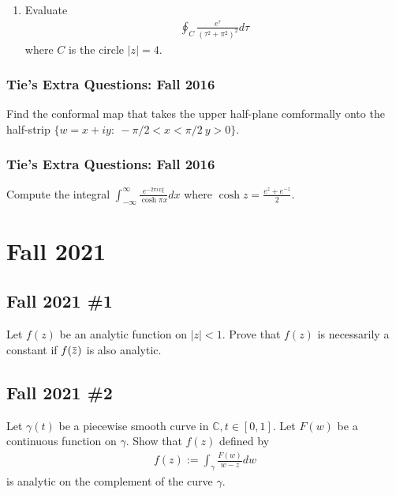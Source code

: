 \begin{enumerate}
\def\labelenumi{(\alph{enumi})}
\setcounter{enumi}{1}
\tightlist
\item
  Evaluate
  \begin{align*}\oint_{C}\frac{e^{\tau}}{(\tau^2+\pi^2)^2}d\tau\end{align*}
  where \(C\) is the circle \(|z|=4\).
\end{enumerate}

\hypertarget{ties-extra-questions-fall-2016-6}{%
\subsubsection{Tie's Extra Questions: Fall
2016}\label{ties-extra-questions-fall-2016-6}}

Find the conformal map that takes the upper half-plane comformally onto
the half-strip \(\{ w=x+iy:\ -\pi/2<x<\pi/2\ y>0\}\).

\hypertarget{ties-extra-questions-fall-2016-7}{%
\subsubsection{Tie's Extra Questions: Fall
2016}\label{ties-extra-questions-fall-2016-7}}

Compute the integral
\(\displaystyle{\int_{-\infty}^{\infty} \frac{e^{-2\pi ix\xi}}{\cosh\pi x}dx}\)
where \(\displaystyle{\cosh z=\frac{e^{z}+e^{-z}}{2}}\).

\hypertarget{fall-2021}{%
\section{Fall 2021}\label{fall-2021}}

\hypertarget{fall-2021-1}{%
\subsection{Fall 2021 \#1}\label{fall-2021-1}}

Let \(f(z)\) be an analytic function on \(|z|<1\). Prove that \(f(z)\)
is necessarily a constant if
\(f(\mkern 1.5mu\overline{\mkern-1.5muz\mkern-1.5mu}\mkern 1.5mu)\) is
also analytic.

\hypertarget{fall-2021-2}{%
\subsection{Fall 2021 \#2}\label{fall-2021-2}}

Let \(\gamma(t)\) be a piecewise smooth curve in
\(\mathbb{C}, t \in[0,1]\). Let \(F(w)\) be a continuous function on
\(\gamma\). Show that \(f(z)\) defined by
\begin{align*}
f(z):=\int_{\gamma} \frac{F(w)}{w-z} d w
\end{align*}
is analytic on the complement of the curve \(\gamma\).

